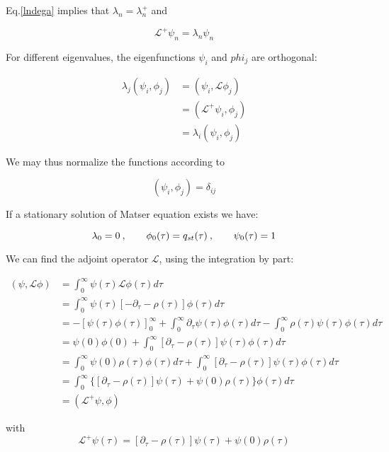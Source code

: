 \documentclass[a4paper,12pt,twoside]{article}
\def \be {\begin{equation}}
\def \ee {\end{equation}}
\begin{document}
Eq.\eqref{lndega} implies that $\lambda_n=\lambda_n^+$ and
	
\be
\label{Ldegaoperator2}
\mathcal{L}^+\psi_n=\lambda_n\psi_n
\ee

For different eigenvalues, the eigenfunctions $\psi_i$ and $phi_j$ are orthogonal:

\begin{align}
\lambda_j(\psi_i,\phi_j) 
&=(\psi_i,\mathcal{L}\phi_j) \nonumber \\
&=(\mathcal{L}^+\psi_i,\phi_j)  \nonumber \\
&=\lambda_i(\psi_i,\phi_j) \label{lorthogonal}
\end{align}

We may thus normalize the functions according to 

\be
\label{dij}
(\psi_i,\phi_j)=\delta_{ij}
\ee

If a stationary solution of Matser equation exists we have:

\be
\lambda_0=0\:, \hspace{0.7cm} \phi_0(\tau)=q_{st}(\tau)\:,\hspace{0.7cm} \psi_0(\tau)=1
\ee

We can find the adjoint operator $\mathcal{L}$, using the integration by part:

\begin{align}
(\psi,\mathcal{L}\phi)&= \int_{0}^{\infty}\psi(\tau)\mathcal{L}\phi(\tau)d\tau  \nonumber \\
&= \int_{0}^{\infty}\psi(\tau)[-\partial_{\tau}-\rho(\tau)]\phi(\tau)d\tau  \nonumber \\
&=-[\psi(\tau)\phi(\tau)]^{\infty}_{0}+\int_{0}^{\infty}\partial_{\tau}\psi(\tau)\phi(\tau)d\tau -\int_{0}^{\infty}\rho(\tau)\psi(\tau)\phi(\tau)d\tau \nonumber \\
&= \psi(0)\phi(0)+ \int_{0}^{\infty}[\partial_{\tau}-\rho(\tau)]\psi(\tau)\phi(\tau)d\tau  \nonumber \\
&=\int_{0}^{\infty} \psi(0)\rho(\tau)\phi(\tau)d\tau+ \int_{0}^{\infty}[\partial_{\tau}-\rho(\tau)]\psi(\tau)\phi(\tau)d\tau  \nonumber \\
&= \int_{0}^{\infty}\{[\partial_{\tau}-\rho(\tau)]\psi(\tau)+ \psi(0)\rho(\tau)\}\phi(\tau)d\tau  \nonumber \\
& = (\mathcal{L}^+\psi,\phi)
\end{align}

with 
\be
\label{Ldega}
\mathcal{L}^+\psi(\tau)=[\partial_{\tau}-\rho(\tau)]\psi(\tau)+\psi(0)\rho(\tau)
\ee
\end{document}
